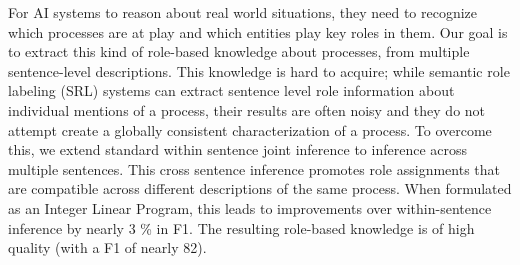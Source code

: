 For AI systems to reason about real world situations, they need to recognize which processes are at play and which entities play key roles in them. Our goal is to extract this kind of role-based knowledge about processes, from multiple sentence-level descriptions. This knowledge is hard to acquire; while semantic role labeling (SRL) systems can extract sentence level role information about individual mentions of a process, their results are often noisy and they do not attempt create a globally consistent characterization of a process. To overcome this, we extend standard within sentence joint inference to inference across multiple sentences. This cross sentence inference promotes role assignments that are compatible across different descriptions of the same process. When formulated as an Integer Linear Program, this leads to improvements over within-sentence inference by nearly 3 \% in F1. The resulting role-based knowledge is of high quality (with a F1 of nearly 82).
